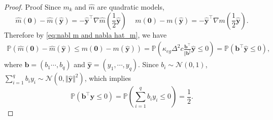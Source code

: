\documentclass[colorlinks=true, linkcolor=blue, citecolor=blue, urlcolor=blue]{article}
\theoremstyle{plain}
\theoremstyle{definition}
\theoremstyle{remark}
\begin{document}
\begin{proof}{Proof}
    Since $m_k$ and $\hat{m}$ are quadratic models,  \begin{equation*}
        \hat{m}(\bm 0)-\hat{m}(\hat{\bm y})=-\hat{\bm y}^\top\nabla\hat{m}(\frac{1}{2}\hat{\bm y})\,\quad
        m(\bm 0)-m(\hat{\bm y})=-\hat{\bm y}^\top\nabla m(\frac{1}{2}\hat{\bm y}).
    \end{equation*}
    Therefore by \eqref{eq:nabl m and nabla hat_m}, we have \begin{equation*}
    \begin{aligned} \mathbb{P}\left(\hat{m}(\bm 0)-\hat{m}(\hat{\bm y})\leq m(\bm 0)-m(\hat{\bm y})\right)=\mathbb{P}(\kappa_{eg}\Delta^2c\frac{\bm b^\top}{\Vert\bm b^\Vert} \hat{\bm y}\leq 0)=\mathbb{P}(\bm b^\top\hat{\bm y}\leq 0),
    \end{aligned}     
    \end{equation*}
    where $\bm b=(b_1\cdots,b_q)$ and $\hat{\bm y}=(y_1,\cdots,y_q)$. Since $b_i\sim \mathcal{N}(0,1)$, $\sum_{i=1}^{q}b_iy_i\sim\mathcal{N}(0,\Vert\hat{\bm y}\Vert^2)$, which implies
    \begin{equation*}
        \mathbb{P}(\bm b^\top\hat{\bm y}\leq 0)=\mathbb{P}(\sum_{i=1}^{q}b_iy_i\leq 0)=\frac{1}{2}.
    \end{equation*}  
    
\end{proof}
\end{document}
